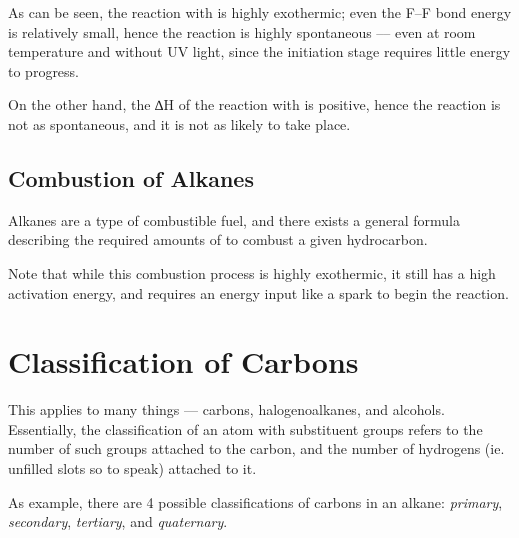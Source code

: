 			As can be seen, the reaction with  is highly exothermic; even the F–F bond energy is relatively small, hence the
			reaction is highly spontaneous –– even at room temperature and without UV light, since the initiation stage requires
			little energy to progress.

			On the other hand, the ∆H of the reaction with  is positive, hence the reaction is not as spontaneous, and it is not
			as likely to take place.



	\pagebreak
	\subsection{Combustion of Alkanes}

		Alkanes are a type of combustible fuel, and there exists a general formula describing the required amounts of 
		to combust a given hydrocarbon.


		Note that while this combustion process is highly exothermic, it still has a high activation energy, and requires an energy
		input like a spark to begin the reaction.


	\section{Classification of Carbons}

		This applies to many things –– carbons, halogenoalkanes, and alcohols. Essentially, the classification of an atom with
		substituent groups refers to the number of such groups attached to the carbon, and the number of hydrogens (ie. unfilled
		slots so to speak) attached to it.

		As example, there are 4 possible classifications of carbons in an alkane: \textit{primary}, \textit{secondary}, \textit{tertiary},
		and \textit{quaternary}.

